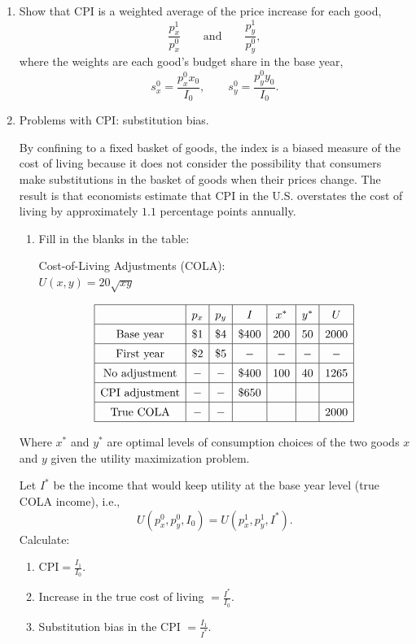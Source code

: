 \documentclass[12pt,a4paper]{article}
\begin{document}
\begin{enumerate}[label=(\alph*)]
  \item Show that CPI is a weighted average of the price increase for each good,
  \[
      \frac{p_x^1}{p_x^0}
      \qquad \text{and} \qquad
      \frac{p_y^1}{p_y^0},
  \]
  where the weights are each good's budget share in the base year,
  \[
      s_x^0=\frac{p_x^0x_0}{I_0},
      \qquad
      s_y^0=\frac{p_y^0y_0}{I_0}.
  \]

  \item Problems with CPI: substitution bias.

  By confining to a fixed basket of goods, the index is a biased measure of the cost of living because it does not consider the possibility that consumers make substitutions in the basket of goods when their prices change. The result is that economists estimate that CPI in the U.S. overstates the cost of living by approximately \(1.1\) percentage points annually.

  \begin{enumerate}[label=(b.\arabic*)]
    \item Fill in the blanks in the table:
      \begin{center}
        Cost-of-Living Adjustments (COLA):\\[4pt]
        \(U(x,y)=20\sqrt{xy}\)
      \end{center}
        \[
        \renewcommand{\arraystretch}{1.4}
        \begin{array}{|c|c|c|c|c|c|c|}
        \hline
        & p_x & p_y & I & x^* & y^* & U \\
        \hline
        \text{Base year} & \$1 & \$4 & \$400 & 200 & 50 & 2000 \\
        \hline
        \text{First year} & \$2 & \$5 & - & - & - & - \\
        \hline
        \text{No adjustment} & - & - & \$400 & 100 & 40 & 1265 \\
        \hline
        \text{CPI adjustment} & - & - & \$650 &  &  &  \\
        \hline
        \text{True COLA} & - & - &  &  &  & 2000 \\
        \hline
        \end{array}
        \]
  \end{enumerate}
  Where \(x^*\) and \(y^*\) are optimal levels of consumption choices of the two goods \(x\) and \(y\) given the utility maximization problem.

  Let \(I^*\) be the income that would keep utility at the base year level (true COLA income), i.e.,
  \[
      U\left(p_x^0,p_y^0,I_0\right)=U\left(p_x^1,p_y^1,I^*\right).
  \]
  Calculate:
  \begin{enumerate}[resume,label=(b.\arabic*)]
  \item CPI\(=\frac{I_1}{I_0}\).
  \item Increase in the true cost of living \(=\frac{I^*}{I_0}\).
  \item Substitution bias in the CPI \(=\frac{I_1}{I^*}\).
  \end{enumerate}
\end{enumerate}
\end{document}
